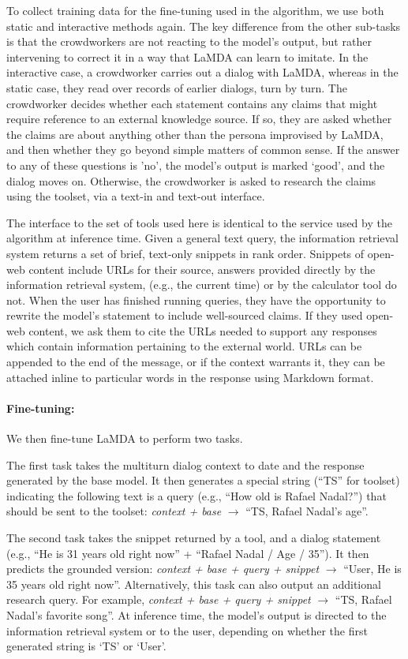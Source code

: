 \documentclass{article}
\def\knowledgetool{information retrieval system\xspace}
\def\knowledgetoolshort{TS\xspace}
\begin{document}
To collect training data for the fine-tuning used in the algorithm, we use both static and interactive methods again. The key difference from the other sub-tasks is that the crowdworkers are not reacting to the model’s output, but rather intervening to correct it in a way that LaMDA can learn to imitate. In the interactive case, a crowdworker carries out a dialog with LaMDA, whereas in the static case, they read over records of earlier dialogs, turn by turn. The crowdworker decides whether each statement contains any claims that might require reference to an external knowledge source. If so, they are asked whether the claims are about anything other than the persona improvised by LaMDA, and then whether they go beyond simple matters of common sense. If the answer to any of these questions is ’no’, the model’s output is marked ‘good’, and the dialog moves on. Otherwise, the crowdworker is asked to research the claims using the toolset, via a text-in and text-out interface.

The interface to the set of tools used here is identical to the service used by the algorithm at inference time. Given a general text query, the \knowledgetool returns a set of brief, text-only snippets in rank order. Snippets of open-web content include URLs for their source, answers provided directly by the \knowledgetool, (e.g., the current time) or by the calculator tool do not. When the user has finished running queries, they have the opportunity to rewrite the model's statement to include well-sourced claims. If they used open-web content, we ask them to cite the URLs  needed to support any responses which contain information pertaining to the external world. URLs can be appended to the end of the message, or if the context warrants it, they can be attached inline to particular words in the response using Markdown format.

\paragraph{Fine-tuning:}We then fine-tune LaMDA to perform two tasks.

The first task takes the multiturn dialog context to date and the response generated by the base model. It then generates a special string (``\knowledgetoolshort'' for toolset) indicating the following text is a query (e.g., ``How old is Rafael Nadal?'') that should be sent to the toolset: \emph{context + base} $\rightarrow$ ``\knowledgetoolshort, Rafael Nadal's age''.

The second task takes the snippet returned by a tool, and a dialog statement (e.g., ``He is 31 years old right now'' + ``Rafael Nadal / Age / 35''). It then predicts the grounded version: \emph{context + base + query + snippet} $\rightarrow$ ``User, He is 35 years old right now''. Alternatively, this task can also output an additional research query. For example, \emph{context + base + query + snippet} $\rightarrow$ ``\knowledgetoolshort, Rafael Nadal's favorite song''. 
At inference time, the model's output is directed to the \knowledgetool or to the user, depending on whether the first generated string is `\knowledgetoolshort' or `User'.
\end{document}

